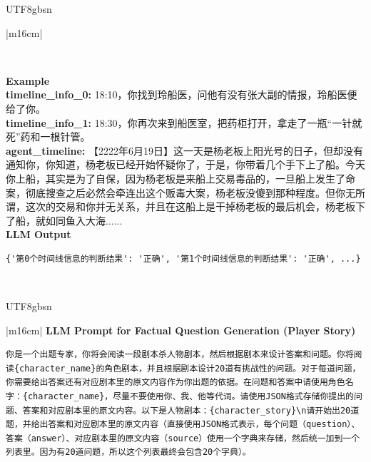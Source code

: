 \documentclass[11pt]{article}
\begin{document}
{\begin{CJK}{UTF8}{gbsn}
\begin{table}[ht!]
\begin{tabular}{|m{16cm}|}
\begin{minipage}[t]{\linewidth}
\begin{verbatim}
\end{verbatim}
\end{minipage} \\
\hline
{}  \textbf{Example}  \\
 \textbf{  timeline\_info\_0:} \small18:10，你找到玲船医，问他有没有张大副的情报，玲船医便给了你。\\
  \textbf{  timeline\_info\_1:} \small18:30，你再次来到船医室，把药柜打开，拿走了一瓶“一针就死”药和一根针管。\\
 \textbf{  agent\_timeline:} \small【2222年6月19日】这一天是杨老板上阳光号的日子，但却没有通知你，你知道，杨老板已经开始怀疑你了，于是，你带着几个手下上了船。今天你上船，其实是为了自保，因为杨老板是来船上交易毒品的，一旦船上发生了命案，彻底搜查之后必然会牵连出这个贩毒大案，杨老板没傻到那种程度。但你无所谓，这次的交易和你并无关系，并且在这船上是干掉杨老板的最后机会，杨老板下了船，就如同鱼入大海......\\
 
\hline
{}  \textbf{LLM Output}  \\
\hline
\begin{minipage}[t]{\linewidth}
\small\begin{verbatim}
{'第0个时间线信息的判断结果': '正确', '第1个时间线信息的判断结果': '正确', ...}

\end{verbatim}
\end{minipage} \\
\hline
\end{tabular}
\caption{LLM prompts and outputs for self-verification.}
\label{table:prompt_self_verification_cn}
\end{table}
\end{CJK}

\begin{CJK}{UTF8}{gbsn}
\begin{table}[ht!]
\centering
\begin{tabular}{|m{16cm}|}
\hline
{}  {\textbf{LLM Prompt for Factual Question Generation (Player Story)}} \\
\begin{minipage}[t]{\linewidth}
\small\begin{verbatim}
你是一个出题专家，你将会阅读一段剧本杀人物剧本，然后根据剧本来设计答案和问题。你将阅读{character_name}的角色剧本，并且根据剧本设计20道有挑战性的问题。对于每道问题，你需要给出答案还有对应剧本里的原文内容作为你出题的依据。在问题和答案中请使用角色名字：{character_name}，尽量不要使用你、我、他等代词。请使用JSON格式存储你提出的问题、答案和对应剧本里的原文内容。以下是人物剧本：{character_story}\n请开始出20道题，并给出答案和对应剧本里的原文内容（直接使用JSON格式表示，每个问题（question）、答案（answer）、对应剧本里的原文内容（source）使用一个字典来存储，然后统一加到一个列表里。因为有20道问题，所以这个列表最终会包含20个字典）。


\end{verbatim}
\end{minipage}
\end{tabular}
\end{table}
\end{CJK}}
\end{document}
